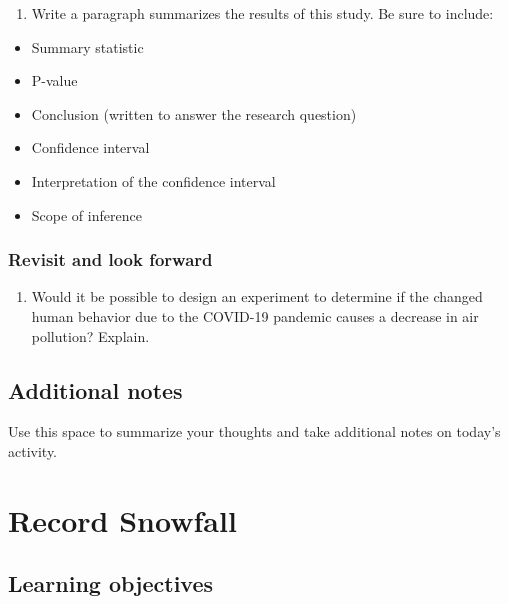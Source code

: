 \documentclass[
]{report}
\providecommand{\tightlist}{%
  \setlength{\itemsep}{0pt}\setlength{\parskip}{0pt}}
\begin{document}
\newpage

\begin{enumerate}
\def\labelenumi{\arabic{enumi}.}
\setcounter{enumi}{18}
\tightlist
\item
  Write a paragraph summarizes the results of this study. Be sure to include:
\end{enumerate}

\begin{itemize}
\item
  Summary statistic
\item
  P-value
\item
  Conclusion (written to answer the research question)
\item
  Confidence interval
\item
  Interpretation of the confidence interval
\item
  Scope of inference
\end{itemize}

\vspace{3in}

\hypertarget{revisit-and-look-forward}{%
\subsection{Revisit and look forward}\label{revisit-and-look-forward}}

\begin{enumerate}
\def\labelenumi{\arabic{enumi}.}
\setcounter{enumi}{19}
\tightlist
\item
  Would it be possible to design an experiment to determine if the changed human behavior due to the COVID-19 pandemic causes a decrease in air pollution? Explain.
  \vspace{1in}
\end{enumerate}

\hypertarget{additional-notes}{%
\section{Additional notes}\label{additional-notes}}

Use this space to summarize your thoughts and take additional notes on today's activity.

\hypertarget{record-snowfall}{%
\chapter{Record Snowfall}\label{record-snowfall}}

\hypertarget{learning-objectives}{%
\section{Learning objectives}\label{learning-objectives}}
\end{document}
